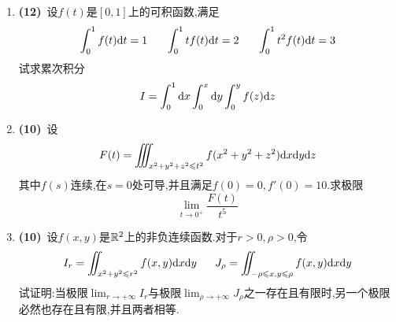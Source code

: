 \documentclass{ctexart}
\begin{document}
\begin{enumerate}[leftmargin=*,label=\textbf{\arabic*.}]
    \item \textbf{(12)}\ 设$f(t)$是$[0,1]$上的可积函数,满足
    \[\int_0^1f(t)\di t=1\ \ \ \ \ \int_0^1tf(t)\di t=2\ \ \ \ \ \int_0^1t^2f(t)\di t=3\]
    试求累次积分
    \[I=\int_0^1\mathrm{d} x\int_0^x\mathrm{d} y\int_0^yf(z)\mathrm{d} z\]

    \item \textbf{(10)}\ 设
    \[F(t)=\iiint_{x^2+y^2+z^2\leqslant t^2}f(x^2+y^2+z^2)\mathrm{d} x\mathrm{d} y\mathrm{d} z\]
    其中$f(s)$连续,在$s=0$处可导,并且满足$f(0)=0,f'(0)=10$.求极限
    \[\lim_{t\to0^+}\dfrac{F(t)}{t^5}\]

    \item \textbf{(10)}\ 设$f(x,y)$是$\mathbb{R}^2$上的非负连续函数.对于$r>0,\rho>0$,令
    \[I_r=\iint_{x^2+y^2\leqslant r^2}f(x,y)\mathrm{d} x\mathrm{d} y\ \ \ \ \ J_{\rho}=\iint_{-\rho\leqslant x,y\leqslant\rho}f(x,y)\mathrm{d} x\mathrm{d} y\]
    试证明:当极限$\displaystyle\lim_{r\to+\infty}I_r$与极限$\displaystyle\lim_{\rho\to+\infty}J_\rho$之一存在且有限时,另一个极限必然也存在且有限,并且两者相等.

\end{enumerate}
\end{document}
